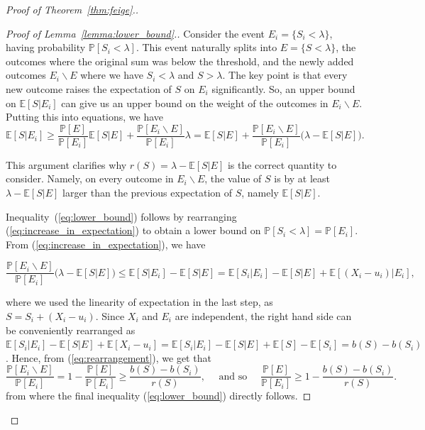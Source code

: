 \documentclass[10pt,a4paper]{article}
\newcommand{\bE}{\mathbb{E}}
\newcommand{\Pb}{\mathbb P}
\begin{document}
\begin{proof}[Proof of Theorem~\ref{thm:feige}.]
\begin{proof}[Proof of Lemma~\ref{lemma:lower_bound}.]
Consider the event $E_i=\{S_i<\lambda\}$, having probability $\Pb[S_i<\lambda]$. This event naturally splits into $E=\{S<\lambda\}$, the outcomes where the original sum was below the threshold, and the newly added outcomes $E_i\backslash E$ where we have $S_i<\lambda$ and $S>\lambda$. The key point is that every new outcome raises the expectation of $S$ on $E_i$ significantly. So, an upper bound on $\bE[S|E_i]$ can give us an upper bound on the weight of the outcomes in $E_i\backslash E$. Putting this into equations, we have
\vspace{-0.2cm}
\begin{equation}\label{eq:increase_in_expectation}
\bE[S|E_i]\geq \frac{\Pb[E]}{\Pb[E_i]}\bE[S|E]+\frac{\Pb[E_i\backslash E]}{\Pb[E_i]}\lambda=\bE[S|E]+\frac{\Pb[E_i\backslash E]}{\Pb[E_i]}\big(\lambda-\bE[S|E]\big).
\end{equation}
\vspace{-0.4cm}

\noindent
This argument clarifies why $r(S)=\lambda-\bE[S|E]$ is the correct quantity to consider. Namely, on every outcome in $E_i\backslash E$, the value of $S$ is by at least $\lambda-\bE[S|E]$ larger than the previous expectation of $S$, namely $\bE[S|E]$. 

Inequality~(\ref{eq:lower_bound}) follows by rearranging (\ref{eq:increase_in_expectation}) to obtain a lower bound on $\Pb[S_i<\lambda]=\Pb[E_i]$. From (\ref{eq:increase_in_expectation}), we have 

\begin{equation}\label{eq:rearrangement}
    \frac{\Pb[E_i\backslash E]}{\Pb[E_i]}\big(\lambda-\bE[S|E]\big)\leq \bE[S|E_i]-\bE[S|E]=\bE[S_i|E_i]-\bE[S|E]+\bE[(X_i-u_i)|E_i],
\end{equation}
\vspace{-0.4cm}

\noindent
where we used the linearity of expectation in the last step, as $S=S_i+(X_i-u_i)$. Since $X_i$ and $E_i$ are independent, the right hand side can be conveniently rearranged as $\bE[S_i|E_i]-\bE[S|E]+\bE[X_i-u_i]=\bE[S_i|E_i]-\bE[S|E]+\bE[S]-\bE[S_i]=b(S)-b(S_i)$. Hence, from (\ref{eq:rearrangement}), we get that 
\vspace{-0.2cm}
\begin{equation*}
   \frac{\Pb[E_i\backslash E]}{\Pb[E_i]}= 1-\frac{\Pb[E]}{\Pb[E_i]}\geq \frac{b(S)-b(S_i)}{r(S)}, \quad \text{ and so } \quad \frac{\Pb[E]}{\Pb[E_i]}\geq 1-\frac{b(S)-b(S_i)}{r(S)}.
\end{equation*}
from where the final inequality (\ref{eq:lower_bound}) directly follows.


\end{proof}
\end{proof}
\end{document}

